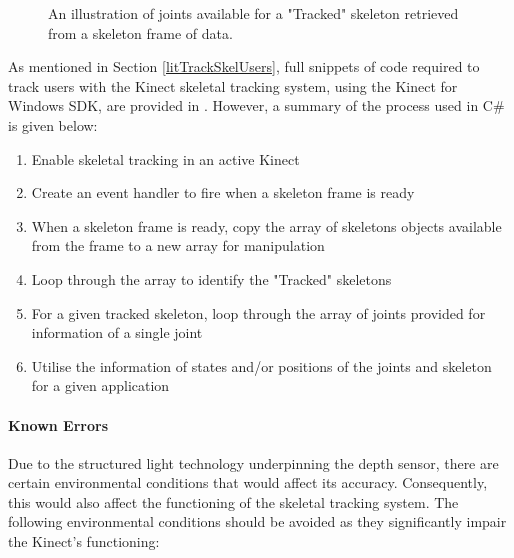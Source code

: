\begin{figure}[ht]
	\centering
	{%
		\setlength{\fboxsep}{0pt}%
		\setlength{\fboxrule}{0.5pt}%
		}
	\caption{An illustration of joints available for a "Tracked" skeleton retrieved from a skeleton frame of data. \cite{msdnTrackUserSkel2017}}
	\label{fig:skelAndJoints}
\end{figure}

As mentioned in Section \ref{litTrackSkelUsers}, full snippets of code required to track users with the Kinect skeletal tracking system, using the Kinect for Windows SDK, are provided in \cite{msdnTrackUserSkel2017}. However, a summary of the process used in C\# is given below:

\begin{enumerate}
	\item Enable skeletal tracking in an active Kinect
	\item Create an event handler to fire when a skeleton frame is ready
	\item When a skeleton frame is ready, copy the array of skeletons objects available from the frame to a new array for manipulation
	\item Loop through the array to identify the "Tracked" skeletons
	\item For a given tracked skeleton, loop through the array of joints provided for information of a single joint
	\item Utilise the information of states and/or positions of the joints and skeleton for a given application
\end{enumerate}

\paragraph{Known Errors}
Due to the structured light technology underpinning the depth sensor, there are certain environmental conditions that would affect its accuracy. Consequently, this would also affect the functioning of the skeletal tracking system. The following environmental conditions should be avoided as they significantly impair the Kinect's functioning: \cite{kinectComp2011}

